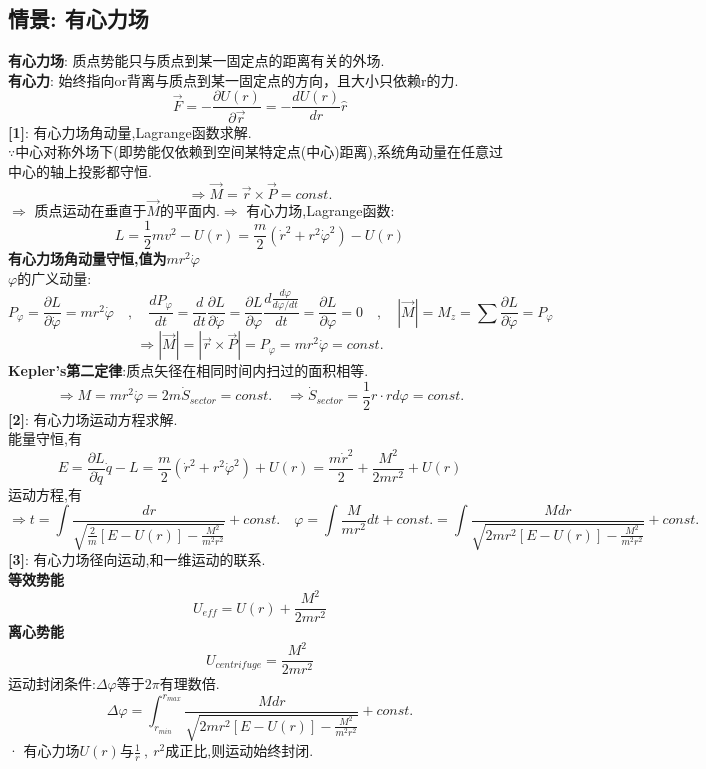 \documentclass{article}
\begin{document}
\subsection{情景: 有心力场}
\textbf{有心力场}: 质点势能只与质点到某一固定点的距离有关的外场.\\
\textbf{有心力}: 始终指向or背离与质点到某一固定点的方向，且大小只依赖r的力.
\[\vec F = -\frac{\partial U(r)}{\partial \vec r} = -\frac{d U(r)}{d r} \hat r\]
\textbf{[1]}: 有心力场角动量,Lagrange函数求解.\\
$\because$中心对称外场下(即势能仅依赖到空间某特定点(中心)距离),系统角动量在任意过中心的轴上投影都守恒.
\[\Rightarrow \vec M = \vec r \times \vec P = const.\]
$\Rightarrow$ 质点运动在垂直于$\vec M$的平面内.\quad $\Rightarrow$ 有心力场,Lagrange函数:
\[L = \frac{1}{2}m v^2 - U(r) = \frac{m}{2} (\dot r^2 + r^2 \dot \varphi ^2) - U(r)\]
\textbf{有心力场角动量守恒,值为$m r^2 \dot \varphi$}\\
$\varphi$的广义动量:
\[P_\varphi = \frac{\partial L}{\partial \dot \varphi} = m r^2 \dot \varphi \quad , \quad \frac{d P_\varphi}{d t} = \frac{d}{d t}\frac{\partial L}{\partial \dot \varphi} = \frac{\partial L}{\partial \varphi} \frac{d \frac{d \varphi}{d \varphi / d t}}{d t} = \frac{\partial L}{\partial \varphi} = 0 \quad , \quad |\vec M| = M_z = \sum \frac{\partial L}{\partial  \dot \varphi} = P_\varphi\]
\[\Rightarrow |\vec M| =| \vec r \times \vec P |= P_\varphi = m r^2 \dot \varphi = const.\]
\textbf{Kepler's第二定律}:质点矢径在相同时间内扫过的面积相等.
\[\Rightarrow M = m r^2 \dot \varphi = 2 m \dot S_{sector} = const.\quad \Rightarrow \dot S_{sector} = \frac{1}{2} r \cdot r d\varphi = const.\]
\textbf{[2]}: 有心力场运动方程求解.\\
能量守恒,有
\[E = \frac{\partial L}{\partial \dot q}\dot q - L = \frac{m}{2} (\dot r^2 + r^2 \dot \varphi ^2) + U(r) = \frac{m \dot r^2}{2} + \frac{M^2}{2mr^2} + U(r)\]
运动方程,有
\[\Rightarrow t = \int \frac{d r}{\sqrt{\frac{2}{m}[E-U(r)] - \frac{M^2}{m^2 r^2}}} + const. \quad \varphi = \int \frac{M}{m r^2} d t  + const.= \int \frac{M dr}{\sqrt{2mr^2 [E-U(r)] - \frac{M^2}{m^2 r^2}}} + const.\]
\textbf{[3]}: 有心力场径向运动,和一维运动的联系.\\
\textbf{等效势能}
\[U_{eff} = U(r) + \frac{M^2}{2mr^2}\]
\textbf{离心势能}
\[U_{centrifuge} = \frac{M^2}{2mr^2}\]
运动封闭条件:$\Delta \varphi$等于$2\pi$有理数倍.
\[\Delta \varphi = \int_{r_{min}} ^{r_{max}} \frac{M dr}{\sqrt{2mr^2 [E-U(r)] - \frac{M^2}{m^2 r^2}}} + const.\]
· 有心力场$U(r)$与$\frac{1}{r}\ ,\ r^2$成正比,则运动始终封闭.
\end{document}

